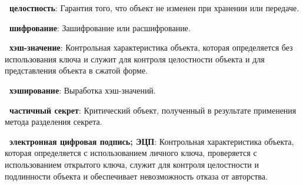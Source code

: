 {\bf \thedefctr~целостность}:
Гарантия того, что объект не изменен при хранении или передаче.

{\bf \thedefctr~шифрование}:
Зашифрование или расшифрование.

{\bf \thedefctr~хэш-значение}:
Контрольная характеристика объекта, 
которая определяется без использования ключа и 
служит для контроля целостности объекта и для представления 
объекта в сжатой форме.


{\bf \thedefctr~хэширование}:
Выработка хэш-значений.


{\bf \thedefctr~частичный секрет}:
Критический объект, 
полученный в результате применения метода разделения секрета.


{\bf \thedefctr~электронная цифровая подпись; ЭЦП}:
Контрольная характеристика объекта, 
которая определяется с использованием личного ключа, 
проверяется с использованием открытого ключа,
служит для контроля целостности и подлинности объекта 
и обеспечивает невозможность отказа от авторства.

